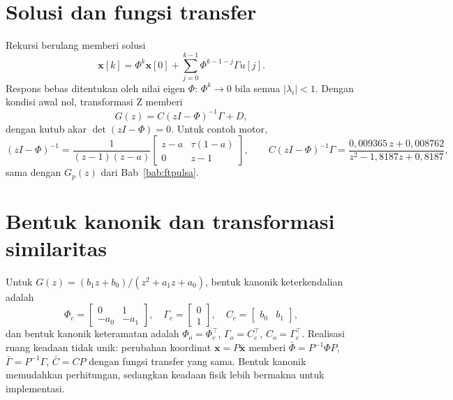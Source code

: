 \section{Solusi dan fungsi transfer}
Rekursi berulang memberi solusi
\begin{equation}
	\mathbf{x}[k] = \Phi^k\mathbf{x}[0] + \sum_{j=0}^{k-1}\Phi^{k-1-j}\Gamma u[j].
\end{equation}
Respons bebas ditentukan oleh nilai eigen $\Phi$: $\Phi^k \to 0$ bila semua $|\lambda_i| < 1$. Dengan kondisi awal nol, transformasi Z memberi
\begin{equation}
	G(z) = C(zI - \Phi)^{-1}\Gamma + D,
\end{equation}
dengan kutub akar $\det(zI - \Phi) = 0$. Untuk contoh motor,
\[
	(zI - \Phi)^{-1} = \frac{1}{(z-1)(z-a)}\begin{bmatrix}z-a & \tau(1-a)\\ 0 & z-1\end{bmatrix},\qquad
	C(zI-\Phi)^{-1}\Gamma = \frac{0{,}009365\,z + 0{,}008762}{z^2 - 1{,}8187z + 0{,}8187},
\]
sama dengan $G_p(z)$ dari Bab~\ref{bab:ftpulsa}.

\section{Bentuk kanonik dan transformasi similaritas}
Untuk $G(z) = (b_1z + b_0)/(z^2 + a_1z + a_0)$, bentuk kanonik keterkendalian adalah
\begin{equation}
	\Phi_c = \begin{bmatrix}0 & 1\\ -a_0 & -a_1\end{bmatrix},\quad \Gamma_c = \begin{bmatrix}0\\ 1\end{bmatrix},\quad C_c = \begin{bmatrix}b_0 & b_1\end{bmatrix},
\end{equation}
dan bentuk kanonik keteramatan adalah $\Phi_o = \Phi_c^\top$, $\Gamma_o = C_c^\top$, $C_o = \Gamma_c^\top$. Realisasi ruang keadaan tidak unik: perubahan koordinat $\mathbf{x} = P\bar{\mathbf{x}}$ memberi $\bar\Phi = P^{-1}\Phi P$, $\bar\Gamma = P^{-1}\Gamma$, $\bar C = CP$ dengan fungsi transfer yang sama. Bentuk kanonik memudahkan perhitungan, sedangkan keadaan fisik lebih bermakna untuk implementasi.

